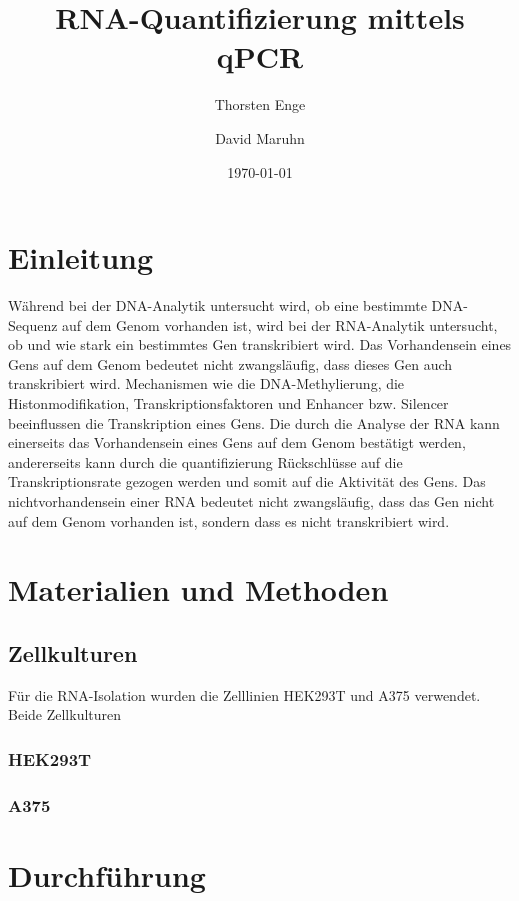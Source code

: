 \documentclass{article}
\title{RNA-Quantifizierung mittels qPCR}
\author{Thorsten Enge \and David Maruhn}
\date{\today}
\begin{document}
\maketitle

\tableofcontents
\newpage

\section{Einleitung}

Während bei der DNA-Analytik untersucht wird, ob eine bestimmte
DNA-Sequenz auf dem Genom vorhanden ist, wird bei der RNA-Analytik
untersucht, ob und wie stark ein bestimmtes Gen transkribiert wird.
Das Vorhandensein eines Gens auf dem Genom bedeutet nicht zwangsläufig,
dass dieses Gen auch transkribiert wird. Mechanismen wie die
DNA-Methylierung, die Histonmodifikation, Transkriptionsfaktoren und
Enhancer bzw. Silencer beeinflussen die Transkription eines Gens.
Die durch die Analyse der RNA kann einerseits das Vorhandensein eines
Gens auf dem Genom bestätigt werden, andererseits kann durch die
quantifizierung Rückschlüsse auf die Transkriptionsrate gezogen werden
und somit auf die Aktivität des Gens. Das nichtvorhandensein einer RNA
bedeutet nicht zwangsläufig, dass das Gen nicht auf dem Genom vorhanden
ist, sondern dass es nicht transkribiert wird.


\section{Materialien und Methoden}

\subsection*{Zellkulturen}
Für die RNA-Isolation wurden die Zelllinien HEK293T und A375 verwendet.
Beide Zellkulturen 
\subsubsection*{HEK293T}
\subsubsection*{A375}


\section{Durchführung}
\end{document}
